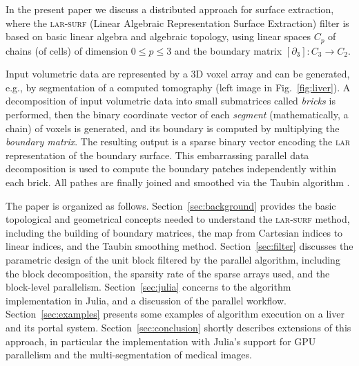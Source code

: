 In the present paper we discuss a distributed approach for surface extraction, where the \textsc{lar-surf} (Linear Algebraic Representation Surface Extraction) filter is based on basic linear algebra and algebraic topology, using linear spaces $C_p$ of chains (of cells) of dimension $0 \leq p \leq 3$ and the boundary matrix $[\partial_3] : C_3 \to C_2$.

Input volumetric data are represented by a 3D voxel array and can be generated, e.g., by segmentation of a computed tomography (left image in Fig.~\ref{fig:liver}). A decomposition of input volumetric data into small submatrices called \emph{bricks} is performed, then the binary coordinate vector of each \emph{segment} (mathematically, a chain) of voxels is generated, and its boundary is computed by multiplying the \emph{boundary matrix}. The resulting output is a sparse binary vector encoding the \textsc{lar} representation of the boundary surface. 
This embarrassing parallel data decomposition is used to
compute the boundary patches independently within each brick. All pathes are finally joined and smoothed via the Taubin algorithm \cite{Taubin1995}.


The paper is organized as follows.
Section~\ref{sec:background} provides the basic topological and geometrical concepts needed to understand the \textsc{lar-surf} method, including the building of boundary matrices, the map from Cartesian indices to linear indices, and the Taubin smoothing method.
Section~\ref{sec:filter} discusses the parametric design of the unit block filtered by the parallel algorithm, including the block decomposition, the sparsity rate of the sparse arrays used, and the block-level parallelism.
Section~\ref{sec:julia} concerns to the algorithm implementation in Julia, and a discussion of the parallel workflow.
Section~\ref{sec:examples} presents some examples of algorithm execution on a liver and its portal system.
Section~\ref{sec:conclusion} shortly describes extensions of this approach, in particular the implementation with Julia's support for GPU parallelism and the multi-segmentation of medical images.
